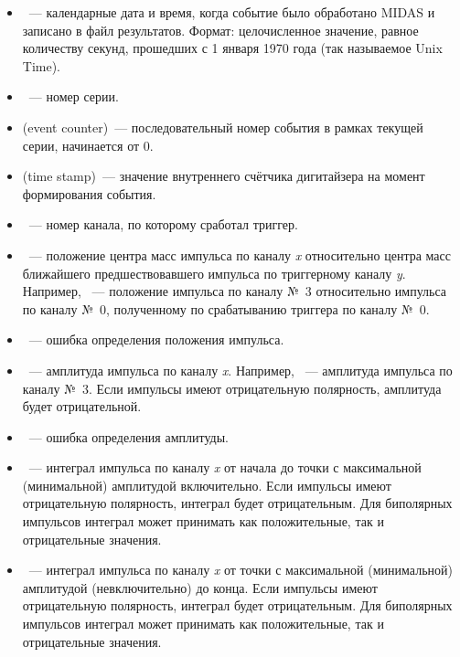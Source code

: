 \documentclass[12pt, a4paper, oneside, onecolumn]{book}
\newcommand{\MIDAS}{\mbox{MIDAS}}
\begin{document}
\begin{itemize}

\item {}~--- календарные дата и время, когда событие было обработано \MIDAS{} и записано в файл результатов. Формат: целочисленное значение, равное количеству секунд, прошедших с 1 января 1970 года (так называемое Unix Time).

\item {}~--- номер серии.

\item {} (event counter)~--- последовательный номер события в рамках текущей серии, начинается от 0.

\item {} (time stamp)~--- значение внутреннего счётчика дигитайзера на момент формирования события.

\item {}~--- номер канала, по которому сработал триггер.

\item {}~--- положение центра масс импульса по каналу {\it x} относительно центра масс ближайшего предшествовавшего импульса по триггерному каналу {\it y}. Например, ~--- положение импульса по каналу №~3 относительно импульса по каналу №~0, полученному по срабатыванию триггера по каналу №~0.

\item {}~--- ошибка определения положения импульса.

\item {}~--- амплитуда импульса по каналу {\it x}. Например, ~--- амплитуда импульса по каналу №~3. Если импульсы имеют отрицательную полярность, амплитуда будет отрицательной.

\item {}~--- ошибка определения амплитуды.

\item {}~--- интеграл импульса по каналу {\it x} от начала до точки с максимальной (минимальной) амплитудой включительно. Если импульсы имеют отрицательную полярность, интеграл будет отрицательным. Для биполярных импульсов интеграл может принимать как положительные, так и отрицательные значения.

\item {}~--- интеграл импульса по каналу {\it x} от точки с максимальной (минимальной) амплитудой (невключительно) до конца.  Если импульсы имеют отрицательную полярность, интеграл будет отрицательным.  Для биполярных импульсов интеграл может принимать как положительные, так и отрицательные значения.

\end{itemize}


\printbibliography
\end{document}
